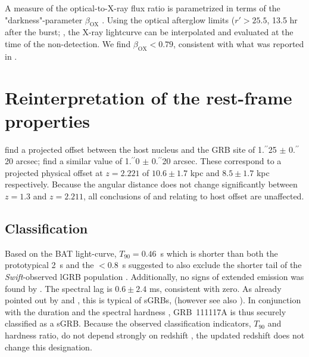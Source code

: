 \documentclass[referee]{aa}
\newcommand{\farc}{\hbox{$.\!\!^{\prime\prime}$}}
\begin{document}
A measure of the optical-to-X-ray flux ratio is parametrized in terms of the
"darkness"-parameter $\beta_\mathrm{OX} $ \citep{Jakobsson2004}. Using the optical
afterglow limits ($r' > 25.5$, 13.5 hr after the burst; \citealt{Cucchiara2011,
	Cenko2011}, the X-ray lightcurve can be interpolated and evaluated at the time
of the non-detection. We find $\beta_\mathrm{OX} < 0.79$, consistent with what was
reported in \citet{Sakamoto2013}.

\section{Reinterpretation of the rest-frame properties}

\citet{Margutti2012} find a projected offset between the host nucleus and the
GRB site of 1\farc25 $\pm$ 0\farc20 arcsec; \citet{Sakamoto2013}
find a similar value of 1\farc0 $\pm$ 0\farc20 arcsec. These correspond
to a projected physical offset at $z = 2.221$ of $10.6 \pm 1.7$ kpc and $8.5 \pm
1.7$ kpc respectively. Because the angular distance does not change
significantly between $z = 1.3$ and $z = 2.211$, all conclusions of
\citet{Margutti2012} and \citet{Sakamoto2013} relating to host offset are
unaffected.

\subsection{Classification} \label{classification}

Based on the BAT light-curve, $T_{90}=0.46$~s which is shorter than both the
prototypical 2~s \citep{Kouveliotou1993} and the $<0.8$~s suggested to also
exclude the shorter tail of the \textit{Swift}-observed lGRB population
\citep{Bromberg2012a}. Additionally, no signs of extended emission was found by
\citet{Sakamoto2013}. The spectral lag is $0.6 \pm2.4$ ms, consistent with zero.
As already pointed out by \citet{Margutti2012} and \citet{Sakamoto2013}, this is
typical of sGRBs, (however see also \citealt{Bernardini2015}). In conjunction
with the duration and the spectral hardness \citep{Sakamoto2011}, GRB~111117A is
thus securely classified as a sGRB. Because the observed classification
indicators, $T_{90}$ and hardness ratio, do not depend strongly on redshift
\citep{Littlejohns2013a}, the updated redshift does not change this designation.
\end{document}
